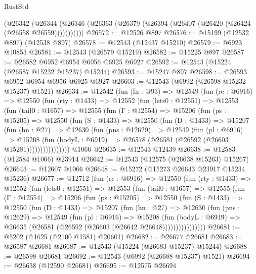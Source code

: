 \begin{lexlean}{RustStd}
\begin{coremodule}
      (@26342
        (@26344 (@26346 (@26363 (@26379 (@26394 (@26407 (@26420 (@26424 (@26558 @26559)))))))))))
@26572 := @12526 @897
@26576 := @15199 (@12532 @897) (@12538 @897)
@26578 := @12543 (@12437 @15210)
@26579 := @6923 @10853
@26581 := @12543 (@26579 @15219)
@26582 := @15225 @897
@26587 := @26582 @6952 @6954 @6956 @6925 @6927
@26592 := @12543 (@15224 (@26587 @15232 @15237) @15244)
@26593 := @15247 @897
@26598 := @26593 @6952 @6954 @6956 @6925 @6927
@26603 := @12543 (@6992 (@26598 @15232 @15237) @1521)
@26634 := @12542
    (fun (fn : @93) =>
    @12549
      (fun (rc : @6916) =>
      @12550
        (fun (rty : @1433) =>
        @12552
          (fun (lets0 : @12551) =>
          @12553
            (fun (tail0 : @1657) =>
            @12555
              (fun (Γ : @12554) =>
              @15206
                (fun (ps : @15205) =>
                @12550
                  (fun (S : @1433) =>
                  @12550
                    (fun (D : @1433) =>
                    @15207
                      (fun (hn : @27) =>
                      @12630
                        (fun (pns : @12629) =>
                        @12549
                          (fun (pl : @6916) =>
                          @15208
                            (fun (bodyL : @6919) =>
                            @26578 (@26581 (@26592 (@26603 @15281))))))))))))))))
    @1066
@26635 := @12543 @12439
@26638 := @12583 (@12584 @1066) @23914
@26642 := @12543 (@12575 (@26638 @15263) @15267)
@26643 := @12607 @1066
@26648 := @15272 (@15273 @26643 @23917 @15234 @15236)
@26677 := @12712
    (fun (rc : @6916) =>
    @12550
      (fun (rty : @1433) =>
      @12552
        (fun (lets0 : @12551) =>
        @12553
          (fun (tail0 : @1657) =>
          @12555
            (fun (Γ : @12554) =>
            @15206
              (fun (ps : @15205) =>
              @12550
                (fun (S : @1433) =>
                @12550
                  (fun (D : @1433) =>
                  @15207
                    (fun (hn : @27) =>
                    @12630
                      (fun (pns : @12629) =>
                      @12549
                        (fun (pl : @6916) =>
                        @15208
                          (fun (bodyL : @6919) =>
                          @26635 (@26581 (@26592 (@26603 (@26642 @26648))))))))))))))))
@26681 := @5202 (@1625 (@2100 @1581) @20601)
@26682 := @26677 @26681
@26683 := @26587 @26681
@26687 := @12543 (@15224 (@26683 @15237) @15244)
@26688 := @26598 @26681
@26692 := @12543 (@6992 (@26688 @15237) @1521)
@26694 := @26638 (@12590 @26681)
@26695 := @12575 @26694

\end{coremodule}
\end{lexlean}
